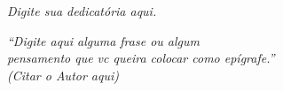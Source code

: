 \documentclass[article,12pt,oneside,a4paper,chapter=TITLE,english,brazil]{abntex2}
\begin{document}
\frenchspacing 


\pretextual


\imprimircapa


\imprimirfolhaderosto


%     


\folhadeaprovacaoUEPB

 
%
% 
%


\newpage
\begin{center}
  \begin{dedicatoria}
    \vspace*{\fill}
    \noindent
    \textit{Digite sua dedicatória aqui.}
    \vspace*{\fill}
  \end{dedicatoria}
\end{center}


\newpage
\begin{epigrafe}
    \vspace*{\fill}
	\begin{flushright}
		\textit{``Digite aqui alguma frase ou algum \\
		pensamento que vc queira colocar como epígrafe.'' \\
		(Citar o Autor aqui)}
	\end{flushright}
\end{epigrafe}
\end{document}

